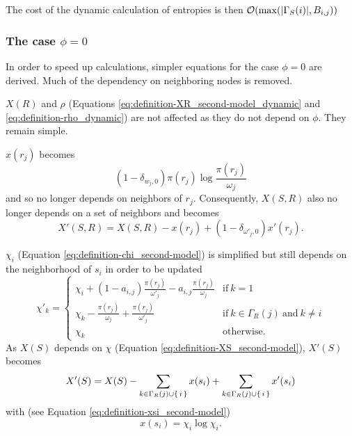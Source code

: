 The cost of the dynamic calculation of entropies is then $\mathcal{O}(\max(|\Gamma_S(i)|, B_{i,j}))$

\subsubsection{The case $\phi=0$}

In order to speed up calculations, simpler equations for the case $\phi=0$ are derived. Much of the dependency on neighboring nodes is removed.

$X(R)$ and $\rho$ (Equations \eqref{eq:definition-XR_second-model_dynamic} and \eqref{eq:definition-rho_dynamic}) are not affected as they do not depend on $\phi$.
They remain simple.

$x(r_j)$ becomes
\begin{equation}
  \label{eq:definition-xrj_second-model_dynamic-phi0}
  (1-\delta_{w_j,0}) \pi(r_j)\log\frac{\pi(r_j)}{\omega_j}
\end{equation}
and so no longer depends on neighbors of $r_j$.
Consequently, $X(S,R)$ also no longer depends on a set of neighbors and becomes
\begin{equation}
  \label{eq:definition-XSR_second-model_dynamic-phi0}
  X'(S,R) = X(S,R) - x(r_j) + (1-\delta_{\omega'_j,0}) x'(r_j).
\end{equation}

$\chi_i$ (Equation \eqref{eq:definition-chi_second-model}) is simplified but still depends on the neighborhood of $s_i$ in order to be updated
\begin{equation}
  \label{eq:definition-chi_second-model_dynamic-phi0}
  \chi'_k = \begin{cases}
    \chi_i + (1-a_{i,j}) \frac{\pi(r_j)}{\omega'_j} - a_{i,j} \frac{\pi(r_j)}{\omega_j} & \text{if}~k=1 \\
    \chi_k - \frac{\pi(r_j)}{\omega_j} + \frac{\pi(r_j)}{\omega'_j} & \text{if}~k\in\Gamma_R(j)~\text{and}~k\neq i \\
    \chi_k & \text{otherwise}.
  \end{cases}
\end{equation}
As $X(S)$ depends on $\chi$ (Equation \eqref{eq:definition-XS_second-model}), $X'(S)$ becomes
\begin{equation}
  \label{eq:definition-XS_second-model_dynamic-phi0}
  X'(S) = X(S) - \sum_{k \in \Gamma_R(j) \cup \{\,i\,\}} x(s_i) + \sum_{k \in \Gamma_R(j) \cup \{\,i\,\}} x'(s_i)
\end{equation}
with (see Equation \eqref{eq:definition-xsi_second-model})
\begin{equation}
  \label{eq:definition-xsi_second-model_dynamic-phi0}
  x(s_i) = \chi_i \log \chi_i.
\end{equation}

